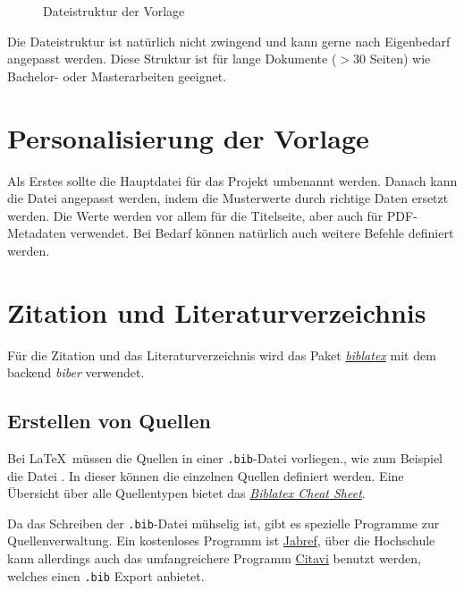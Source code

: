 \begin{figure}[htb]
	\caption{Dateistruktur der Vorlage}
	\label{fig:Dateistruktur}
\end{figure}

Die Dateistruktur ist natürlich nicht zwingend und kann gerne nach Eigenbedarf angepasst werden. Diese Struktur ist für lange Dokumente ($>30$ Seiten) wie Bachelor- oder Masterarbeiten geeignet.

\section{Personalisierung der Vorlage}
Als Erstes sollte die Hauptdatei  für das Projekt umbenannt werden. Danach kann die Datei  angepasst werden, indem die Musterwerte durch richtige Daten ersetzt werden. Die Werte werden vor allem für die Titelseite, aber auch für PDF-Metadaten verwendet. Bei Bedarf können natürlich auch weitere Befehle definiert werden.

\section{Zitation und Literaturverzeichnis}
Für die Zitation und das Literaturverzeichnis wird das Paket \href{https://ctan.org/pkg/biblatex?lang=de}{\textit{biblatex}} mit dem backend \textit{biber} verwendet.

\subsection{Erstellen von Quellen}
Bei \LaTeX\ müssen die Quellen in einer \verb|.bib|-Datei vorliegen., wie zum Beispiel die Datei . In dieser können die einzelnen Quellen definiert werden. Eine Übersicht über alle Quellentypen bietet das \href{http://tug.ctan.org/info/biblatex-cheatsheet/biblatex-cheatsheet.pdf}{\textit{Biblatex Cheat Sheet}}.

Da das Schreiben der \verb|.bib|-Datei mühselig ist, gibt es spezielle Programme zur Quellenverwaltung. Ein kostenloses Programm ist \href{https://www.jabref.org/}{Jabref}, über die Hochschule kann allerdings auch das umfangreichere Programm \href{https://www.citavi.com/de}{Citavi} benutzt werden, welches einen \verb|.bib| Export anbietet.

